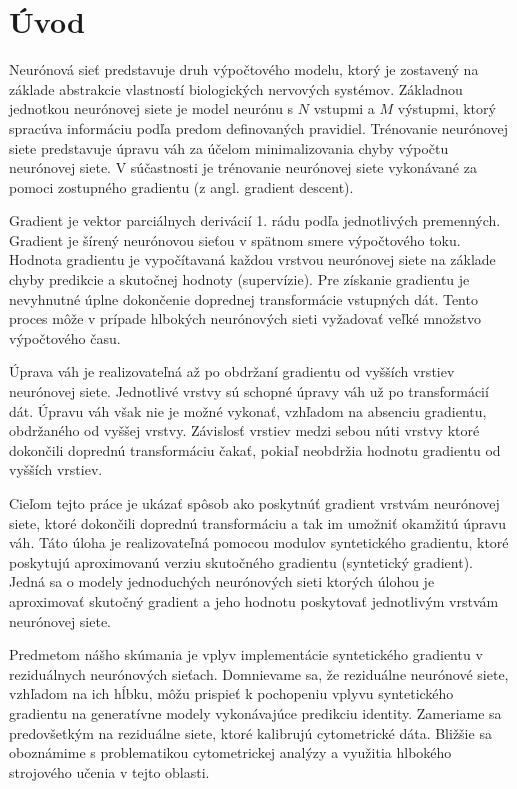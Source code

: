 \chapter*{Úvod} %

Neurónová sieť predstavuje druh výpočtového modelu, ktorý je zostavený na základe abstrakcie vlastností biologických nervových systémov. Základnou jednotkou neurónovej siete je model neurónu s $N$ vstupmi a $M$ výstupmi, ktorý spracúva informáciu podľa predom definovaných pravidiel. Trénovanie neurónovej siete predstavuje úpravu váh za účelom minimalizovania chyby výpočtu neurónovej siete. V súčastnosti je trénovanie neurónovej siete vykonávané za pomoci zostupného gradientu (z angl. gradient descent). %

Gradient je vektor parciálnych derivácií 1. rádu podľa jednotlivých premenných. Gradient je šírený neurónovou sieťou v spätnom smere výpočtového toku. Hodnota gradientu je vypočítavaná každou vrstvou neurónovej siete na základe chyby predikcie a skutočnej hodnoty (supervízie). Pre získanie gradientu je nevyhnutné úplne dokončenie doprednej transformácie vstupných dát. Tento proces môže v prípade hlbokých neurónových sieti vyžadovať veľké množstvo výpočtového času. 

Úprava váh je realizovateľná až po obdržaní gradientu od vyšších vrstiev neurónovej siete. Jednotlivé vrstvy sú schopné úpravy váh už po transformácií dát. Úpravu váh však nie je možné vykonať, vzhľadom na absenciu gradientu, obdržaného od vyššej vrstvy. Závislosť vrstiev medzi sebou núti vrstvy ktoré dokončili doprednú transformáciu čakať, pokiaľ neobdržia hodnotu gradientu od vyšších vrstiev.

Cieľom tejto práce je ukázať spôsob ako poskytnúť gradient vrstvám neurónovej siete, ktoré dokončili
doprednú transformáciu a tak im umožniť okamžitú úpravu váh. Táto úloha je realizovateľná pomocou modulov syntetického gradientu, ktoré poskytujú aproximovanú verziu skutočného gradientu (syntetický gradient). Jedná sa o modely jednoduchých neurónových sieti ktorých úlohou je aproximovať skutočný gradient a jeho hodnotu poskytovať jednotlivým vrstvám neurónovej siete. 

Predmetom nášho skúmania je vplyv implementácie syntetického gradientu v reziduálnych neurónových sieťach. Domnievame sa, že reziduálne neurónové siete, vzhľadom na ich hĺbku, môžu prispieť k pochopeniu vplyvu syntetického gradientu na generatívne modely vykonávajúce predikciu identity. Zameriame sa predovšetkým na reziduálne siete, ktoré kalibrujú cytometrické dáta. Bližšie sa oboznámime s problematikou cytometrickej analýzy a využitia hlbokého strojového učenia v tejto oblasti.

